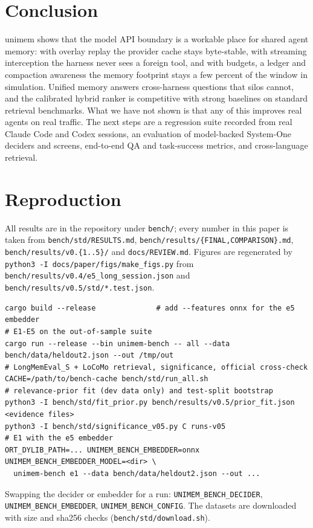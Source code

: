 \documentclass[10pt,twocolumn]{article}
\newcommand{\sys}{\textsf{unimem}}
\newcommand{\code}[1]{\texttt{\small #1}}
\begin{document}
\section{Conclusion}
\sys{} shows that the model API boundary is a workable place for shared agent memory: with overlay replay the provider cache
stays byte-stable, with streaming interception the harness never sees a foreign tool, and with budgets, a ledger and
compaction awareness the memory footprint stays a few percent of the window in simulation. Unified memory answers
cross-harness questions that silos cannot, and the calibrated hybrid ranker is competitive with strong baselines on standard
retrieval benchmarks. What we have not shown is that any of this improves real agents on real traffic. The next steps are a
regression suite recorded from real Claude Code and Codex sessions, an evaluation of model-backed System-One deciders and screens,
end-to-end QA and task-success metrics, and cross-language retrieval.

\footnotesize


\normalsize

\appendix
\onecolumn
\section{Reproduction}
\label{app:repro}
All results are in the repository under \code{bench/}; every number in this paper is taken from
\code{bench/std/RESULTS.md}, \code{bench/results/\{FINAL,COMPARISON\}.md}, \code{bench/results/v0.\{1..5\}/} and
\code{docs/REVIEW.md}. Figures are regenerated by \code{python3 -I docs/paper/figs/make\_figs.py} from
\code{bench/results/v0.4/e5\_long\_session.json} and \code{bench/results/v0.5/std/*.test.json}.
\begin{small}
\begin{verbatim}
cargo build --release              # add --features onnx for the e5 embedder
# E1-E5 on the out-of-sample suite
cargo run --release --bin unimem-bench -- all --data bench/data/heldout2.json --out /tmp/out
# LongMemEval_S + LoCoMo retrieval, significance, official cross-check
CACHE=/path/to/bench-cache bench/std/run_all.sh
# relevance-prior fit (dev data only) and test-split bootstrap
python3 -I bench/std/fit_prior.py bench/results/v0.5/prior_fit.json <evidence files>
python3 -I bench/std/significance_v05.py C runs-v05
# E1 with the e5 embedder
ORT_DYLIB_PATH=... UNIMEM_BENCH_EMBEDDER=onnx UNIMEM_BENCH_EMBEDDER_MODEL=<dir> \
  unimem-bench e1 --data bench/data/heldout2.json --out ...
\end{verbatim}
\end{small}
Swapping the decider or embedder for a run: \code{UNIMEM\_BENCH\_DECIDER}, \code{UNIMEM\_BENCH\_EMBEDDER},
\code{UNIMEM\_BENCH\_CONFIG}. The datasets are downloaded with size and sha256 checks (\code{bench/std/download.sh}).
\end{document}
